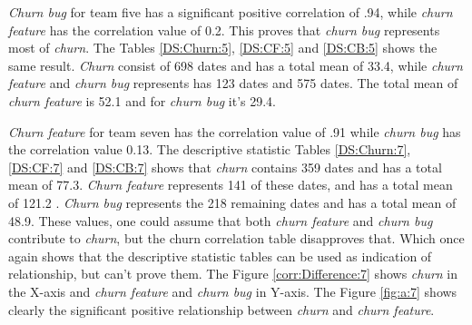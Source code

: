 \documentclass[UKenglish]{ifimaster}  %
\begin{document}
\textit{Churn bug} for team five has a significant positive correlation of .94, while \textit{churn feature} has the correlation value of 0.2. This proves that \textit{churn bug} represents most of \textit{churn}. The Tables \ref{DS:Churn:5}, \ref{DS:CF:5} and \ref{DS:CB:5} shows the same result. \textit{Churn} consist of 698 dates and has a total mean of 33.4, while \textit{churn feature} and \textit{churn bug} represents has 123 dates and 575 dates. The total mean of \textit{churn feature} is 52.1 and for \textit{churn bug} it's 29.4. 

\textit{Churn feature} for team seven has the correlation value of .91 while \textit{churn bug} has the correlation value 0.13. The descriptive statistic Tables \ref{DS:Churn:7}, \ref{DS:CF:7} and \ref{DS:CB:7} shows that \textit{churn} contains 359 dates and has a total mean of 77.3.  \textit{Churn feature} represents 141 of these dates, and has a total mean of 121.2 .  \textit{Churn bug} represents the 218 remaining dates and has a total mean of 48.9. These values, one could assume that both  \textit{churn feature} and  \textit{churn bug} contribute to  \textit{churn}, but the churn correlation table disapproves that. Which once again shows that the descriptive statistic tables can be used as indication of relationship, but can't prove them. The Figure \ref{corr:Difference:7} shows \textit{churn} in the X-axis and \textit{churn feature} and \textit{churn bug} in Y-axis. The Figure \ref{fig:a:7} shows clearly the significant positive relationship between \textit{churn} and \textit{churn feature}.
\end{document}
